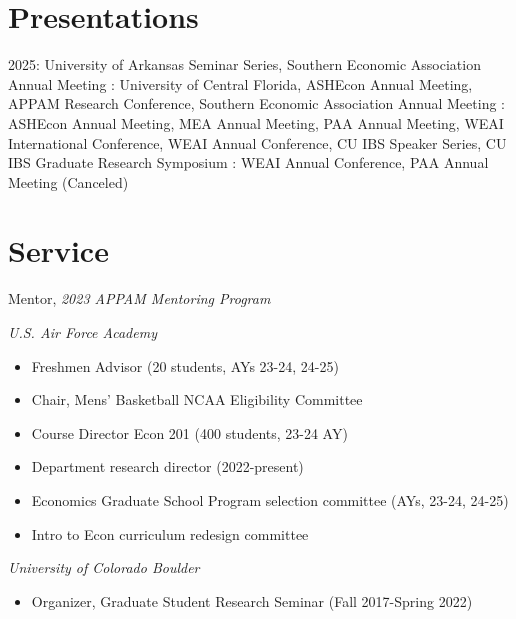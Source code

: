 \documentclass[letterpaper]{article}
\begin{document}
\section*{Presentations}
2025: University of Arkansas Seminar Series, Southern Economic Association Annual Meeting
\newline{}: University of Central Florida, ASHEcon Annual Meeting, APPAM Research Conference, Southern Economic Association Annual Meeting
\newline{}: ASHEcon Annual Meeting, MEA Annual Meeting, PAA Annual Meeting, WEAI International Conference, WEAI Annual Conference, CU IBS Speaker Series, CU IBS Graduate Research Symposium
\newline{}: WEAI Annual Conference, PAA Annual Meeting (Canceled)

\section*{Service}
Mentor, \textit{2023 APPAM Mentoring Program}
\vspace*{.5em}

\textit{U.S. Air Force Academy}
  \begin{itemize}[topsep=2pt,itemsep=-1pt,leftmargin=1em]
    \item[] Freshmen Advisor (20 students, AYs 23-24, 24-25)
    \item[] Chair, Mens' Basketball NCAA Eligibility Committee
    \item[] Course Director Econ 201 (400 students, 23-24 AY)
    \item[] Department research director (2022-present)
    \item[] Economics Graduate School Program selection committee (AYs, 23-24, 24-25)
    \item[] Intro to Econ curriculum redesign committee
  \end{itemize}
  \vspace*{.5em}
\textit{University of Colorado Boulder}
  \begin{itemize}[topsep=2pt,itemsep=-1pt,leftmargin=1em]
    \item[] Organizer, Graduate Student Research Seminar (Fall 2017-Spring 2022)
  \end{itemize}
\end{document}
